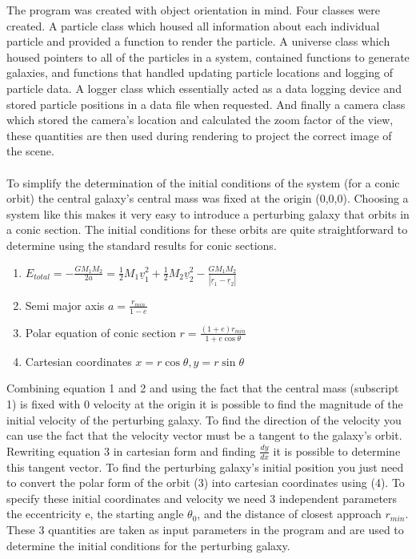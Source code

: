 \documentclass[10pt,a4paper]{article}
\begin{document}
The program was created with object orientation in mind. Four classes were created. A particle class which housed all information about each individual particle and provided a function to render the particle. A universe class which housed pointers to all of the particles in a system, contained functions to generate galaxies, and functions that handled updating particle locations and logging of particle data. A logger class which essentially acted as a data logging device and stored particle positions in a data file when requested. And finally a camera class which stored the camera's location and calculated the zoom factor of the view, these quantities are then used during rendering to project the correct image of the scene.
\\
\\
To simplify the determination of the initial conditions of the system (for a conic orbit) the central galaxy's central mass was fixed at the origin (0,0,0). Choosing a system like this makes it very easy to introduce a perturbing galaxy that orbits in a conic section. The initial conditions for these orbits are quite straightforward to determine using the standard results for conic sections.

\begin{enumerate}
\item $E_{total} = -\frac{G M_1 M_2}{2 a} =\frac{1}{2} M_1 \underline{v}_1^2 + \frac{1}{2} M_2 \underline{v}_2^2 -\frac{G M_1 M_2}{|\underline{r}_1-\underline{r}_2|}$
\item Semi major axis $a = \frac{r_{min}}{1-e}$
\item Polar equation of conic section $r = \frac{(1+e)r_{min}}{1+e\cos{\theta}}$
\item Cartesian coordinates $x=r\cos{\theta},y=r\sin{\theta}$
\end{enumerate}

Combining equation 1 and 2 and using the fact that the central mass (subscript 1) is fixed with 0 velocity at the origin it is possible to find the magnitude of the initial velocity of the perturbing galaxy. To find the direction of the velocity you can use the fact that the velocity vector must be a tangent to the galaxy's orbit. Rewriting equation 3 in cartesian form and finding $\frac{dy}{dx}$ it is possible to determine this tangent vector. To find the perturbing galaxy's initial position you just need to convert the polar form of the orbit (3) into cartesian coordinates using (4). To specify these initial coordinates and velocity we need 3 independent parameters the eccentricity e, the starting angle $\theta_0$, and the distance of closest approach $r_{min}$. These 3 quantities are taken as input parameters in the program and are used to determine the initial conditions for the perturbing galaxy.
\end{document}
